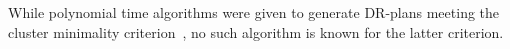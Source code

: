 While polynomial time algorithms were given to generate DR-plans meeting the cluster minimality criterion~\cite{lomonosov2004graph}, no such algorithm is known for the latter criterion.










